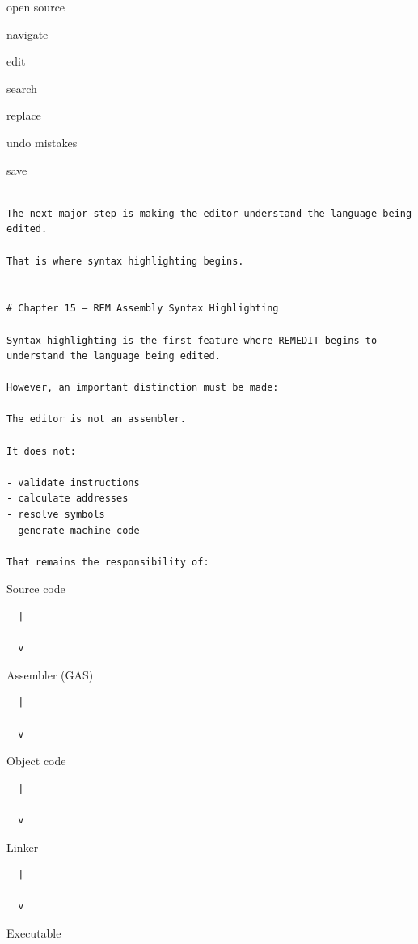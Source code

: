 \documentclass[
  oneside,
  openany]{book}
\begin{document}
open source

navigate

edit

search

replace

undo mistakes

save

\begin{verbatim}

The next major step is making the editor understand the language being edited.

That is where syntax highlighting begins.


# Chapter 15 — REM Assembly Syntax Highlighting

Syntax highlighting is the first feature where REMEDIT begins to understand the language being edited.

However, an important distinction must be made:

The editor is not an assembler.

It does not:

- validate instructions
- calculate addresses
- resolve symbols
- generate machine code

That remains the responsibility of:
\end{verbatim}

Source code

\begin{verbatim}
  |

  v
\end{verbatim}

Assembler (GAS)

\begin{verbatim}
  |

  v
\end{verbatim}

Object code

\begin{verbatim}
  |

  v
\end{verbatim}

Linker

\begin{verbatim}
  |

  v
\end{verbatim}

Executable
\end{document}
